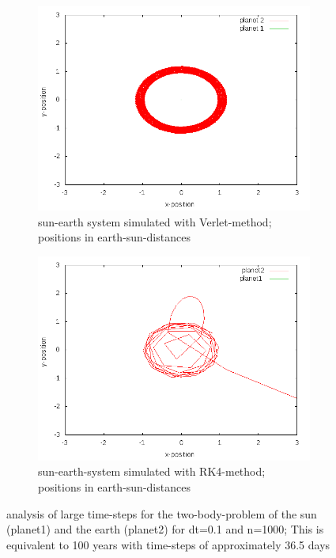 \documentclass[10pt,a4paper]{article}
\begin{document}
\begin{figure}[h]
\centering
\begin{subfigure}{0.45\textwidth}
\centering
	\includegraphics[width=\textwidth]{Verletposition2largetimesteps.png}
	\caption{sun-earth system simulated with Verlet-method; positions in earth-sun-distances \label{TWOB_earth-sun-Verlet-largetimesteps}}
\end{subfigure}
\begin{subfigure}{0.45\textwidth}
\centering
	\includegraphics[width=\textwidth]{Rungekuttaposition_largetimesteps.png}
	\caption{sun-earth-system simulated with RK4-method; positions in earth-sun-distances \label{TWOB_earth-sun-RK4-largetimesteps}}
\end{subfigure}
\caption{analysis of large time-steps for the two-body-problem of the sun (planet1) and the earth (planet2) for dt=0.1 and n=1000; This is equivalent to 100 years with time-steps of approximately 36.5 days }
\end{figure}
\end{document}
